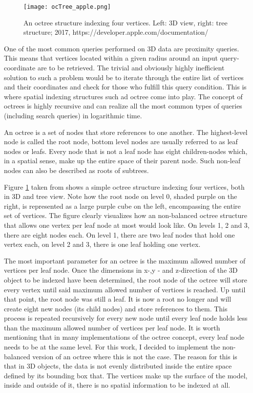 \begin{figure}[htb]
  \centering
  \texttt{[image: ocTree\_apple.png]}\\ %
  \caption{An octree structure indexing four vertices. Left: 3D view, right: tree structure; 2017, https://developer.apple.com/documentation/}\label{fig:ocTree_apple}
\end{figure}

One of the most common queries performed on 3D data are proximity queries. This means that vertices located within a given radius around an input query-coordinate are to be retrieved. The trivial and obviously highly inefficient solution to such a problem would be to iterate through the entire list of vertices and their coordinates and check for those who fulfill this query condition. This is where spatial indexing structures such ad octree come into play. The concept of octrees is highly recursive and can realize all the most common types of queries (including search queries) in logarithmic time.

An octree is a set of nodes that store references to one another. The highest-level node is called the root node, bottom level nodes are usually referred to as leaf nodes or leafs. Every node that is not a leaf node has eight children-nodes which, in a spatial sense, make up the entire space of their parent node. Such non-leaf nodes can also be described as roots of subtrees.

Figure \ref{fig:ocTree_apple} taken from \cite{octAp} shows a simple octree structure indexing four vertices, both in 3D and tree view. Note how the root node on level 0, shaded purple on the right, is represented as a large purple cube on the left, encompassing the entire set of vertices. The figure clearly visualizes how an non-balanced octree structure that allows one vertex per leaf node at most would look like. On levels 1, 2 and 3, there are eight nodes each. On level 1, there are two leaf nodes that hold one vertex each, on level 2 and 3, there is one leaf holding one vertex.

The most important parameter for an octree is the maximum allowed number of vertices per leaf node. Once the dimensions in x-,y - and z-direction of the 3D object to be indexed have been determined, the root node of the octree will store every vertex until said maximum allowed number of vertices is reached. Up until that point, the root node was still a leaf. It is now a root no longer and will create eight new nodes (its child nodes) and store references to them. This process is repeated recursively for every new node until every leaf node holds less than the maximum allowed number of vertices per leaf node. It is worth mentioning that in many implementations of the octree concept, every leaf node needs to be at the same level. For this work, I decided to implement the non-balanced version of an octree where this is not the case. The reason for this is that in 3D objects, the data is not evenly distributed inside the entire space defined by its bounding box that. The vertices make up the surface of the model, inside and outside of it, there is no spatial information to be indexed at all.

